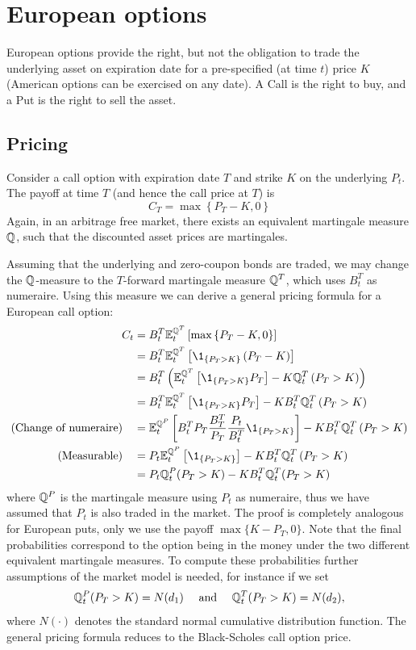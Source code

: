 \section{European options}
European options provide the right, but not the obligation to trade the underlying asset on
expiration date for a pre-specified (at time $t$) price $K$ (American options can be exercised on
any date). A Call is the right to buy, and a Put is the right to sell the asset.

\subsection{Pricing}
Consider a call option with expiration date $T$ and strike $K$ on the underlying $P_{t}$. The payoff
at time $T$ (and hence the call price at $T$) is
\[
C_{T}=\max \left\{P_{T}-K, 0\right\}
\]
Again, in an arbitrage free market, there exists an equivalent martingale measure $\mathbb{Q}$, such that
the discounted asset prices are martingales. 

Assuming that the underlying and zero-coupon bonds are traded, we may change the $\mathbb{Q}$-measure to the
$T$-forward martingale measure $\mathbb{Q}^{T}$, which uses $B_t^{T}$ as numeraire.
Using this measure we can derive a general pricing formula for a European call option:
\begin{align*}
C_{t} & =B_{t}^{T} \E_{t}^{\Q^{T}}\left[\max \left\{P_{T}-K, 0\right\}\right] \\
& =B_{t}^{T} \E_{t}^{\Q^{T}}\left[\1_{\left\{P_{T}>K\right\}}\left(P_{T}-K\right)\right] \\
& =B_{t}^{T}\left(\E_{t}^{\Q^{T}}\left[\1_{\left\{P_{T}>K\right\}} P_{T}\right]-K \Q^{T}_t\left(P_{T}>K\right)\right) \\
& =B_{t}^{T} \E_{t}^{\Q^{T}}\left[\1_{\left\{P_{T}>K\right\}} P_{T}\right]-K B_{t}^{T} \Q^{T}_t\left(P_{T}>K\right) \\
\text{(Change of numeraire)}\quad & =\E_{t}^{\Q^{P}}\left[B_{t}^{T}P_T \frac{B_{T}^{T}}{P_T}
\frac{P_t}{B_{t}^{T}} \1_{\left\{P_{T}>K\right\}}\right]-K B_{t}^{T} \Q_{t}^{T}\left(P_{T}>K\right) \\
\text{(Measurable)}\quad & =P_{t} \E_{t}^{\Q^{P}}\left[\1_{\left\{P_{T}>K\right\}}\right]-K B_{t}^{T} \Q_{t}^{T}\left(P_{T}>K\right) \\
& =P_{t} \Q_{t}^{P}(P_{T}>K)-K B_{t}^{T} \Q_{t}^{T}(P_{T}>K)
\end{align*}
where $\mathbb{Q}^{P}$ is the martingale measure using $P_{t}$ as numeraire, thus we have assumed that $P_t$
is also traded in the market. The proof is completely analogous for European puts, only we use the
payoff $\max \{ K - P_T, 0 \}$. Note that the final probabilities correspond to the option being in
the money under the two different equivalent martingale measures. To compute these probabilities
further assumptions of the market model is needed, for instance if we set
\[ 
\mathbb{Q}^{P}_t (P_T > K) = N(d_1) \quad  \text{ and } \quad 
\mathbb{Q}^{T}_t (P_T > K) = N(d_2)
,\]
where $N(\cdot )$ denotes the standard normal cumulative distribution function. The general
pricing formula reduces to the Black-Scholes call option price.


